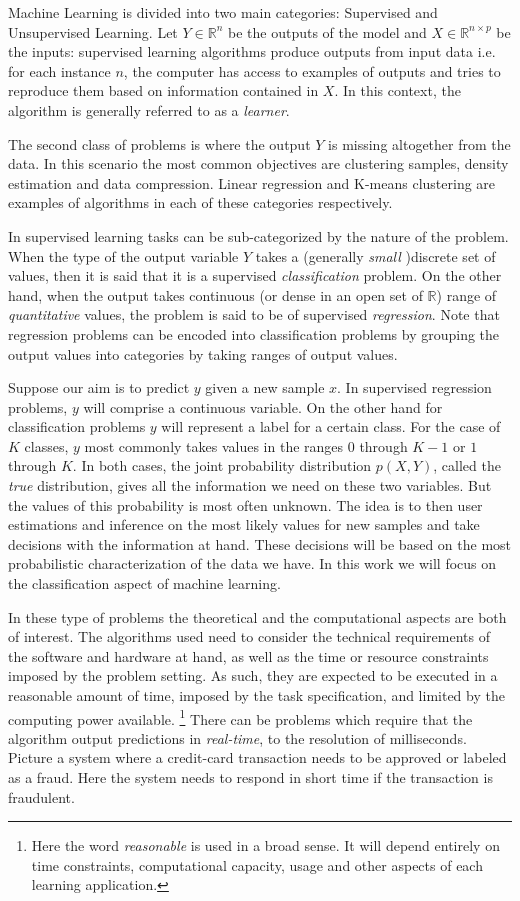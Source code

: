 Machine Learning is divided into two main categories: Supervised and Unsupervised Learning. Let $Y \in \mathbb{R}^n$ be the outputs of the model and $X \in \mathbb{R}^{n \times  p}$ be the inputs: supervised learning algorithms produce outputs from input data i.e. for each instance $n$, the computer has access to examples of outputs and tries to reproduce them based on information contained in $X$. In this context, the algorithm is generally referred to as a \textit{learner}.

The second class of problems is where the output $Y$ is missing altogether from the data. In this scenario the most common objectives are clustering samples, density estimation and data compression. Linear regression and K-means clustering are examples of algorithms in each of these categories respectively.

In supervised learning tasks can be sub-categorized by the nature of the problem. When the type of the output variable $Y$ takes a (generally \textit{small} )discrete set of values, then it is said that it is a supervised \textit{classification} problem. On the other hand, when the output takes continuous (or dense in an open set of $\mathbb{R}$) range of \textit{quantitative} values, the problem is said to be of supervised \textit{regression}. Note that regression problems can be encoded into classification problems by grouping the output values into categories by taking ranges of output values.

Suppose our aim is to predict $y$ given a new sample $x$. In supervised regression problems, $y$ will comprise a continuous variable. On the other hand for classification problems $y$ will represent a label for a certain class. For the case of $K$ classes, $y$ most commonly takes values in the ranges $0$ through $K-1$  or $1$ through $K$. In both cases, the joint probability distribution $p(X, Y)$, called the \textit{true} distribution, gives all the information we need on these two variables. But the values of this probability is most often unknown. The idea is to then user estimations and inference on the most likely values for new samples and take decisions with the information at hand. These decisions will be based on the most probabilistic characterization of the data we have. In this work we will focus on the classification aspect of machine learning.

In these type of problems the theoretical and the computational aspects are both of interest. The algorithms used need to consider the technical requirements of the software and hardware at hand, as well as the time or resource constraints imposed by the problem setting. As such, they are expected to be executed in a reasonable amount of time, imposed by the task specification, and limited by the computing power available. \footnote{Here the word \textit{reasonable} is used in a broad sense. It will depend entirely on time constraints, computational capacity, usage and other aspects of each learning application.} There can be  problems which require that the algorithm output predictions in \textit{real-time}, to the resolution of milliseconds. Picture a system where a credit-card transaction needs to be approved or labeled as a fraud. Here the system needs to respond in short time if the transaction is fraudulent.

